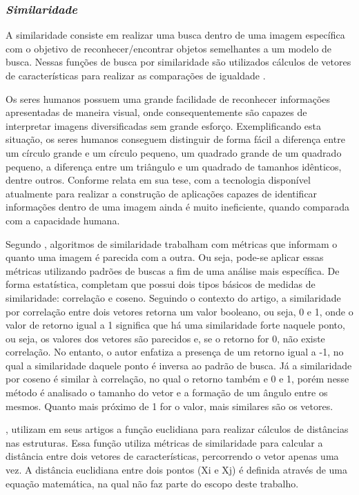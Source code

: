 \subsubsection{\textit{Similaridade}}

A similaridade consiste em realizar uma busca dentro de uma imagem específica com o objetivo de reconhecer/encontrar objetos semelhantes a um modelo de busca. Nessas funções de busca por similaridade são utilizados cálculos de vetores de características para realizar as comparações de igualdade \cite{MAIZA2013}.

Os seres humanos possuem uma grande facilidade de reconhecer informações apresentadas de maneira visual, onde consequentemente são capazes de interpretar imagens diversificadas sem grande esforço. Exemplificando esta situação, os seres humanos conseguem distinguir de forma fácil a diferença entre um círculo grande e um círculo pequeno, um quadrado grande de um quadrado pequeno, a diferença entre um triângulo e um quadrado de tamanhos idênticos, dentre outros. Conforme  relata em sua tese, com a tecnologia disponível atualmente para realizar a construção de aplicações capazes de identificar informações dentro de uma imagem ainda é muito ineficiente, quando comparada com a capacidade humana.

Segundo , algoritmos de similaridade trabalham com métricas que informam o quanto uma imagem é parecida com a outra. Ou seja, pode-se aplicar essas métricas utilizando padrões de buscas a fim de uma análise mais específica. De forma estatística,  completam que possui dois tipos básicos de medidas de similaridade: correlação e coseno. Seguindo o contexto do artigo, a similaridade por correlação entre dois vetores retorna um valor booleano, ou seja, 0 e 1, onde o valor de retorno igual a 1 significa que há uma similaridade forte naquele ponto, ou seja, os valores dos vetores são parecidos e, se o retorno for 0, não existe correlação. No entanto, o autor enfatiza a presença de um retorno igual a -1, no qual a similaridade daquele ponto é inversa ao padrão de busca. Já a similaridade por coseno é similar à correlação, no qual o retorno também e 0 e 1, porém nesse método é analisado o tamanho do vetor e a formação de um ângulo entre os mesmos. Quanto mais próximo de 1 for o valor, mais similares são os vetores.

,  utilizam em seus artigos a função euclidiana para realizar cálculos de distâncias nas estruturas. Essa função utiliza métricas de similaridade para calcular a distância entre dois vetores de características, percorrendo o vetor apenas uma vez. A distância euclidiana entre dois pontos (Xi e Xj) é definida através de uma equação matemática, na qual não faz parte do escopo deste trabalho.
